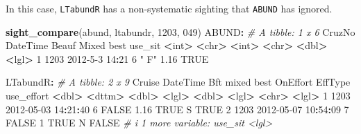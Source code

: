 \documentclass[
]{book}
\newenvironment{Shaded}{\begin{snugshade}}{\end{snugshade}}
\newcommand{\CommentTok}[1]{\textcolor[rgb]{0.56,0.35,0.01}{\textit{#1}}}
\newcommand{\ConstantTok}[1]{\textcolor[rgb]{0.56,0.35,0.01}{#1}}
\newcommand{\DecValTok}[1]{\textcolor[rgb]{0.00,0.00,0.81}{#1}}
\newcommand{\ErrorTok}[1]{\textcolor[rgb]{0.64,0.00,0.00}{\textbf{#1}}}
\newcommand{\FloatTok}[1]{\textcolor[rgb]{0.00,0.00,0.81}{#1}}
\newcommand{\FunctionTok}[1]{\textcolor[rgb]{0.13,0.29,0.53}{\textbf{#1}}}
\newcommand{\NormalTok}[1]{#1}
\newcommand{\SpecialCharTok}[1]{\textcolor[rgb]{0.81,0.36,0.00}{\textbf{#1}}}
\newcommand{\StringTok}[1]{\textcolor[rgb]{0.31,0.60,0.02}{#1}}
\begin{document}
In this case, \texttt{LTabundR} has a non-systematic sighting that \texttt{ABUND} has ignored.

\begin{Shaded}
\begin{Highlighting}[]
\FunctionTok{sight\_compare}\NormalTok{(abund, ltabundr, }\DecValTok{1203}\NormalTok{, }\StringTok{\textquotesingle{}049\textquotesingle{}}\NormalTok{)}
\NormalTok{ABUND}\SpecialCharTok{:}
\CommentTok{\# A tibble: 1 x 6}
\NormalTok{  CruzNo DateTime       Beauf Mixed  best use\_sit}
   \SpecialCharTok{\textless{}}\NormalTok{int}\SpecialCharTok{\textgreater{}} \ErrorTok{\textless{}}\NormalTok{chr}\SpecialCharTok{\textgreater{}}          \ErrorTok{\textless{}}\NormalTok{int}\SpecialCharTok{\textgreater{}} \ErrorTok{\textless{}}\NormalTok{chr}\SpecialCharTok{\textgreater{}} \ErrorTok{\textless{}}\NormalTok{dbl}\SpecialCharTok{\textgreater{}} \ErrorTok{\textless{}}\NormalTok{lgl}\SpecialCharTok{\textgreater{}}  
\DecValTok{1}   \DecValTok{1203} \DecValTok{2012{-}5{-}3} \DecValTok{14}\SpecialCharTok{:}\DecValTok{21}     \DecValTok{6} \StringTok{" F"}   \FloatTok{1.16} \ConstantTok{TRUE}   

\NormalTok{LTabundR}\SpecialCharTok{:}
\CommentTok{\# A tibble: 2 x 9}
\NormalTok{  Cruise DateTime              Bft mixed  best OnEffort EffType use\_effort}
   \SpecialCharTok{\textless{}}\NormalTok{dbl}\SpecialCharTok{\textgreater{}} \ErrorTok{\textless{}}\NormalTok{dttm}\SpecialCharTok{\textgreater{}}              \ErrorTok{\textless{}}\NormalTok{dbl}\SpecialCharTok{\textgreater{}} \ErrorTok{\textless{}}\NormalTok{lgl}\SpecialCharTok{\textgreater{}} \ErrorTok{\textless{}}\NormalTok{dbl}\SpecialCharTok{\textgreater{}} \ErrorTok{\textless{}}\NormalTok{lgl}\SpecialCharTok{\textgreater{}}    \ErrorTok{\textless{}}\NormalTok{chr}\SpecialCharTok{\textgreater{}}   \ErrorTok{\textless{}}\NormalTok{lgl}\SpecialCharTok{\textgreater{}}     
\DecValTok{1}   \DecValTok{1203} \DecValTok{2012{-}05{-}03} \DecValTok{14}\SpecialCharTok{:}\DecValTok{21}\SpecialCharTok{:}\DecValTok{40}     \DecValTok{6} \ConstantTok{FALSE}  \FloatTok{1.16} \ConstantTok{TRUE}\NormalTok{     S       }\ConstantTok{TRUE}      
\DecValTok{2}   \DecValTok{1203} \DecValTok{2012{-}05{-}07} \DecValTok{10}\SpecialCharTok{:}\DecValTok{54}\SpecialCharTok{:}\DecValTok{09}     \DecValTok{7} \ConstantTok{FALSE}  \DecValTok{1}    \ConstantTok{TRUE}\NormalTok{     N       }\ConstantTok{FALSE}     
\CommentTok{\# i 1 more variable: use\_sit \textless{}lgl\textgreater{}}
\end{Highlighting}
\end{Shaded}
\end{document}
